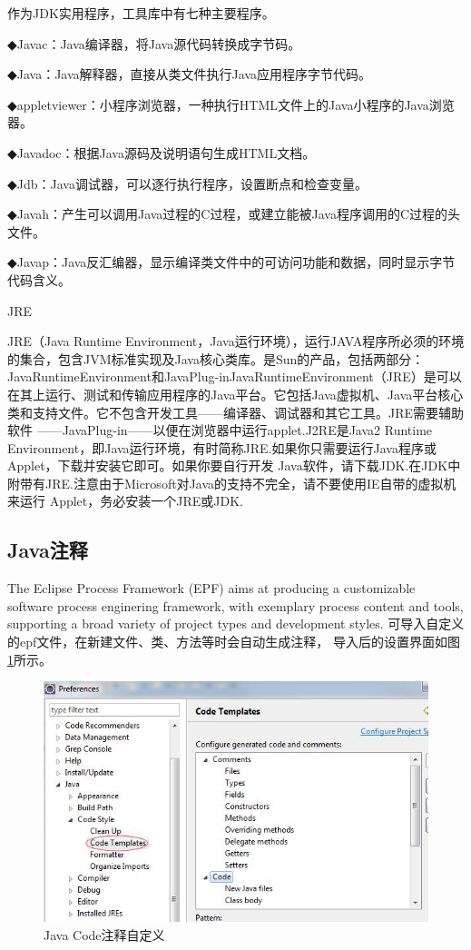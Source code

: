 \documentclass{book}
\begin{document}
作为JDK实用程序，工具库中有七种主要程序。

◆Javac：Java编译器，将Java源代码转换成字节码。

◆Java：Java解释器，直接从类文件执行Java应用程序字节代码。

◆appletviewer：小程序浏览器，一种执行HTML文件上的Java小程序的Java浏览器。

◆Javadoc：根据Java源码及说明语句生成HTML文档。

◆Jdb：Java调试器，可以逐行执行程序，设置断点和检查变量。

◆Javah：产生可以调用Java过程的C过程，或建立能被Java程序调用的C过程的头文件。

◆Javap：Java反汇编器，显示编译类文件中的可访问功能和数据，同时显示字节代码含义。

JRE

JRE（Java Runtime Environment，Java运行环境），运行JAVA程序所必须的环境的集合，包含JVM标准实现及Java核心类库。是Sun的产品，包括两部分：JavaRuntimeEnvironment和JavaPlug-inJavaRuntimeEnvironment（JRE）是可以在其上运行、测试和传输应用程序的Java平台。它包括Java虚拟机、Java平台核心类和支持文件。它不包含开发工具——编译器、调试器和其它工具。JRE需要辅助软件 ——JavaPlug-in——以便在浏览器中运行applet.J2RE是Java2 Runtime Environment，即Java运行环境，有时简称JRE.如果你只需要运行Java程序或Applet，下载并安装它即可。如果你要自行开发 Java软件，请下载JDK.在JDK中附带有JRE.注意由于Microsoft对Java的支持不完全，请不要使用IE自带的虚拟机来运行 Applet，务必安装一个JRE或JDK.

\subsection{Java注释}

The Eclipse Process Framework (EPF) aims at producing a customizable software process enginering framework, 
with exemplary process content and tools, supporting a broad variety of project types and development styles.
可导入自定义的epf文件，在新建文件、类、方法等时会自动生成注释，
导入后的设置界面如图\ref{code:JavaCodeTemplate}所示。

\begin{figure}[htbp]
	\centering
	\includegraphics[scale=0.6]{JavaCodeTemplate.jpg}
	\caption{Java Code注释自定义}
	\label{code:JavaCodeTemplate}
\end{figure}
\end{document}
